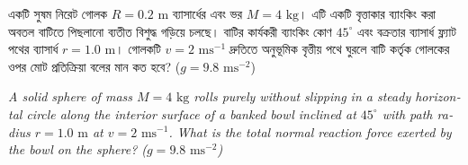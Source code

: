 \documentclass[12pt, a4paper]{article}
\begin{document}
\begin{tcolorbox}[questionbox={প্রশ্ন (Question) 11}]
\noindent
একটি সুষম নিরেট গোলক $R = 0.2\text{ m}$ ব্যাসার্ধের এবং ভর $M = 4\text{ kg}$। এটি একটি বৃত্তাকার ব্যাংকিং করা অবতল বাটিতে পিছলানো ব্যতীত বিশুদ্ধ গড়িয়ে চলছে। বাটির কার্যকরী ব্যাংকিং কোণ $45^\circ$ এবং বক্রতার ব্যাসার্ধ ফ্ল্যাট পথের ব্যাসার্ধ $r = 1.0\text{ m}$। গোলকটি $v = 2\text{ ms}^{-1}$ দ্রুতিতে অনুভূমিক বৃত্তীয় পথে ঘুরলে বাটি কর্তৃক গোলকের ওপর মোট প্রতিক্রিয়া বলের মান কত হবে? ($g = 9.8\text{ ms}^{-2}$)

\vspace{0.8em}
\begin{english}
\noindent\textit{\color{darkgray}
A solid sphere of mass $M = 4\text{ kg}$ rolls purely without slipping in a steady horizontal circle along the interior surface of a banked bowl inclined at $45^\circ$ with path radius $r = 1.0\text{ m}$ at $v = 2\text{ ms}^{-1}$. What is the total normal reaction force exerted by the bowl on the sphere? ($g = 9.8\text{ ms}^{-2}$)
}
\end{english}
\end{tcolorbox}

\vspace{1em}
\begin{center}
\end{center}
\vspace{1em}
\end{document}
